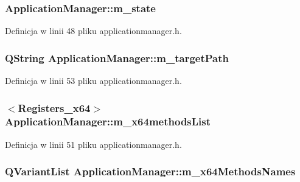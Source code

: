 \hypertarget{class_application_manager_a371f65b49801926244ecc6283d05a965}{
\subsubsection[{m\-\_\-state}]{ Application\-Manager\-::m\-\_\-state\hspace{0.3cm}{\ttfamily [private]}}}\label{class_application_manager_a371f65b49801926244ecc6283d05a965}


Definicja w linii 48 pliku applicationmanager.\-h.

\hypertarget{class_application_manager_afef59bc227cf3e7c4b88e5328572afee}{
\subsubsection[{m\-\_\-target\-Path}]{\setlength{\rightskip}{0pt plus 5cm}Q\-String Application\-Manager\-::m\-\_\-target\-Path\hspace{0.3cm}{\ttfamily [private]}}}\label{class_application_manager_afef59bc227cf3e7c4b88e5328572afee}


Definicja w linii 53 pliku applicationmanager.\-h.

\hypertarget{class_application_manager_a36e1de12b3c278574f5a0f71cae72d37}{
\subsubsection[{m\-\_\-x64methods\-List}]{$<${\bf Registers\-\_\-x64}$>$ Application\-Manager\-::m\-\_\-x64methods\-List\hspace{0.3cm}{\ttfamily [private]}}}\label{class_application_manager_a36e1de12b3c278574f5a0f71cae72d37}


Definicja w linii 51 pliku applicationmanager.\-h.

\hypertarget{class_application_manager_a77d122c9028919af104a0ac9992ecdc1}{
\subsubsection[{m\-\_\-x64\-Methods\-Names}]{\setlength{\rightskip}{0pt plus 5cm}Q\-Variant\-List Application\-Manager\-::m\-\_\-x64\-Methods\-Names\hspace{0.3cm}{\ttfamily [private]}}}\label{class_application_manager_a77d122c9028919af104a0ac9992ecdc1}


